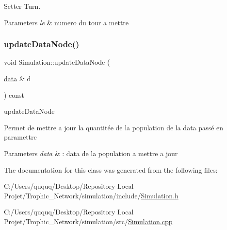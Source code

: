 Setter Turn. 


\begin{DoxyParams}{Parameters}
{\em le} & numero du tour a mettre \\
\hline
\end{DoxyParams}
\mbox{\label{class_simulation_aef637346a3cf4fc4c5f807f2b5bbae61}} 
\subsubsection{\texorpdfstring{update\+Data\+Node()}{updateDataNode()}}
{\footnotesize\ttfamily void Simulation\+::update\+Data\+Node (\begin{DoxyParamCaption}\item[{\mbox{\hyperlink{_graph_8h_a98cbe1f79429fc62806b32b6e8871d9e}{data}} \&}]{d }\end{DoxyParamCaption}) const}



update\+Data\+Node 

Permet de mettre a jour la quantitée de la population de la data passé en paramettre


\begin{DoxyParams}{Parameters}
{\em data} & \+: data de la population a mettre a jour \\
\hline
\end{DoxyParams}


The documentation for this class was generated from the following files\+:\begin{DoxyCompactItemize}
\item 
C\+:/\+Users/ququq/\+Desktop/\+Repository Local Projet/\+Trophic\+\_\+\+Network/simulation/include/\mbox{\hyperlink{_simulation_8h}{Simulation.\+h}}\item 
C\+:/\+Users/ququq/\+Desktop/\+Repository Local Projet/\+Trophic\+\_\+\+Network/simulation/src/\mbox{\hyperlink{_simulation_8cpp}{Simulation.\+cpp}}\end{DoxyCompactItemize}
